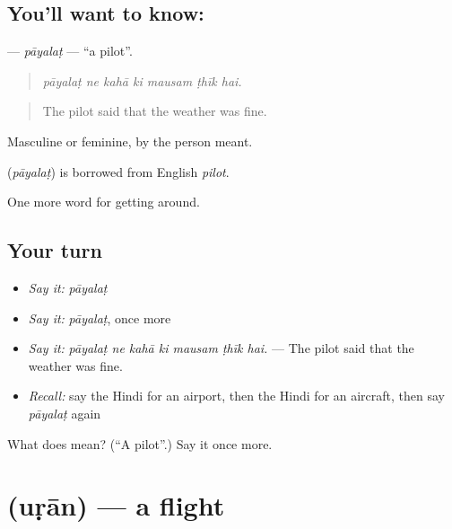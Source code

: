 \subsection*{You'll want to know: }
\textbf{} — \emph{pāyalaṭ} — \textquotedblleft{}a pilot\textquotedblright{}.

\begin{quote}
      
\end{quote}

\begin{quote}
\emph{pāyalaṭ ne kahā ki mausam ṭhīk hai.}
\end{quote}

\begin{quote}
The pilot said that the weather was fine.
\end{quote}

Masculine or feminine, by the person meant.

\begin{cousinweb}
\textbf{} (\emph{pāyalaṭ}) is borrowed from English \emph{pilot}.
\end{cousinweb}

\begin{grammarlens}[title={What you've built}]
One more word for getting around.
\end{grammarlens}

\subsection*{Your turn}
\begin{itemize}
\raggedright
  \item \emph{Say it:} \emph{pāyalaṭ}
  \item \emph{Say it:} \emph{pāyalaṭ}, once more
  \item \emph{Say it:} \emph{pāyalaṭ ne kahā ki mausam ṭhīk hai.} — The pilot said that the weather was fine.
  \item \emph{Recall:} say the Hindi for an airport, then the Hindi for an aircraft, then say \emph{pāyalaṭ} again
\end{itemize}

\begin{tcolorbox}[breakable,colback=teal!4,colframe=teal!35!black,title={Before you move on}]
What does  mean? (\textquotedblleft{}A pilot\textquotedblright{}.) Say it once more.
\end{tcolorbox}
\section[\texorpdfstring{\hi{उड़ान} (uṛān)}{उड़ान (uṛān)}]{ (uṛān) — a flight}

